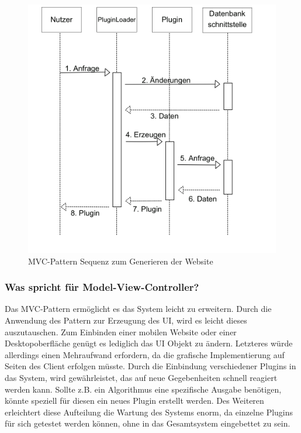 \begin{figure}[h]
\centering
\includegraphics[width=1.0\linewidth]{Grafik/Diagramm/Pattern/MVC/Plugin/Sequenzdiagramm.png}
\caption[MVC Website Sequenz]{MVC-Pattern Sequenz zum Generieren der Website}
\end{figure}

\clearpage

\subsubsection{Was spricht für Model-View-Controller?}
Das MVC-Pattern ermöglicht es das System leicht zu erweitern. Durch die Anwendung des Pattern zur Erzeugung des UI, wird es leicht dieses auszutauschen. Zum Einbinden einer mobilen Website oder einer Desktopoberfläche genügt es lediglich das UI Objekt zu ändern. Letzteres würde allerdings einen Mehraufwand erfordern, da die grafische Implementierung auf Seiten des Client erfolgen müsste.
Durch die Einbindung verschiedener Plugins in das System, wird gewährleistet, das auf neue Gegebenheiten schnell reagiert werden kann.
Sollte z.B. ein Algorithmus eine spezifische Ausgabe benötigen, könnte speziell für diesen ein neues Plugin erstellt werden. 
Des Weiteren erleichtert diese Aufteilung die Wartung des Systems enorm, da einzelne Plugins für sich getestet werden können, ohne in das Gesamtsystem eingebettet zu sein. 


